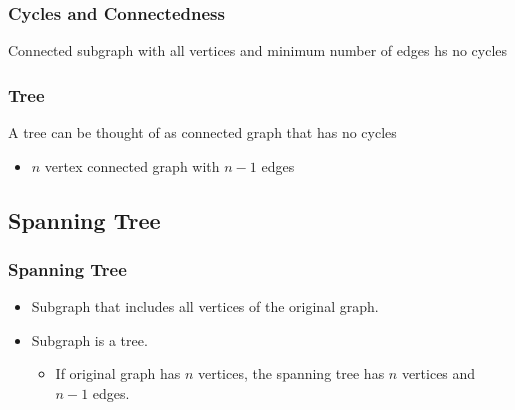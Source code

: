 \documentclass[newPxFont,sthlmFooter,nooffset]{beamer}
\begin{document}
\begin{frame}[t]
  \frametitle{Cycles and Connectedness}
Connected subgraph with all vertices and minimum number of edges hs no cycles
\begin{center}
\end{center}
\end{frame}


\begin{frame}[t]
  \frametitle{Tree}
A tree can be thought of as connected graph that has no cycles
\begin{itemize}
\item $n$ vertex connected graph with $n-1$ edges
\end{itemize}
\end{frame}





\subsection{Spanning Tree}
\begin{frame}[t]
  \frametitle{Spanning Tree}
  \begin{itemize}
  \item Subgraph that includes all vertices of the original graph.
  \item Subgraph is a tree.
    \begin{itemize}
    \item If original graph has $n$ vertices, the spanning tree has $n$
      vertices and $n-1$ edges.
    \end{itemize}

  \end{itemize}

\end{frame}
\end{document}

